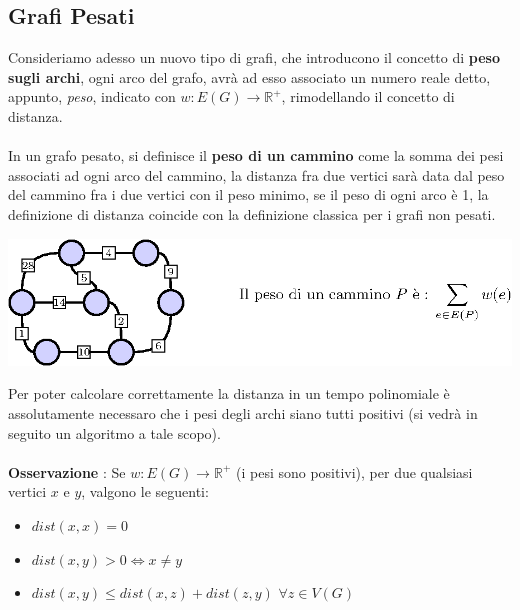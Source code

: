 \documentclass[12pt, letterpaper]{article}
\newcommand{\acc}{\\\hphantom{}\\}
\begin{document}
\subsection{Grafi Pesati}
Consideriamo adesso un nuovo tipo di grafi, che introducono il concetto di \textbf{peso sugli archi}, ogni arco del grafo, 
avrà ad esso associato un numero reale detto, appunto, \textit{peso}, indicato con $w : E(G)\rightarrow \mathbb{R}^+$,
rimodellando il concetto di distanza.\acc 
In un grafo pesato, si definisce il \textbf{peso di un cammino} come la somma dei pesi associati ad ogni arco del cammino,
la distanza fra due vertici sarà data dal peso del cammino fra i due vertici con il peso minimo, se il peso di ogni 
arco è 1, la definizione di distanza coincide con la definizione classica per i grafi non pesati. \begin{center}
    \includegraphics[width=1\textwidth ]{images/grafoPesato.eps}
    \end{center}  
Per poter calcolare correttamente la distanza in un tempo polinomiale è assolutamente necessaro che 
i pesi degli archi siano tutti positivi (si vedrà in seguito un algoritmo a tale scopo).\acc 
\textbf{Osservazione} : Se  $w : E(G)\rightarrow \mathbb{R}^+$ (i pesi sono positivi), per due qualsiasi 
vertici $x$ e $y$, valgono le seguenti:\begin{itemize}
    \item $dist(x,x)=0$
    \item $dist(x,y)>0\iff x\ne y$
    \item $dist(x,y)\le dist(x,z)+dist(z,y)$ $\forall z\in V(G)$
\end{itemize}
\end{document}
